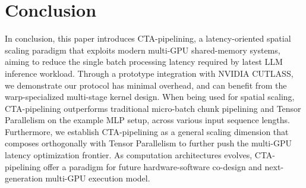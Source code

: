 \section{Conclusion}

In conclusion, this paper introduces CTA-pipelining, a latency-oriented spatial scaling paradigm that exploits modern multi-GPU shared-memory systems, aiming to reduce the single batch processing latency required by latest LLM inference workload. Through a prototype integration with NVIDIA CUTLASS, we demonstrate our protocol has minimal overhead, and can benefit from the warp-specialized multi-stage kernel design. When being used for spatial scaling, CTA-pipelining outperforms traditional micro-batch chunk pipelining and Tensor Parallelism on the example MLP setup, across various input sequence lengths. Furthermore, we establish CTA-pipelining as a general scaling dimension that composes orthogonally with Tensor Parallelism to further push the multi-GPU latency optimization frontier. As computation architectures evolves, CTA-pipelining offer a paradigm for future hardware-software co-design and next-generation multi-GPU execution model.

